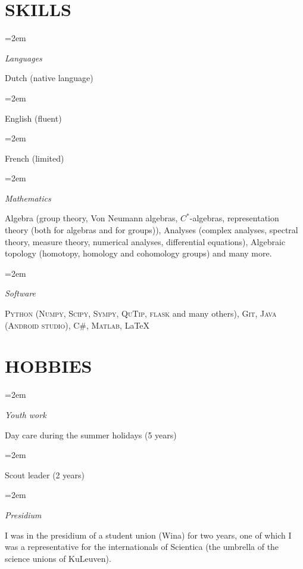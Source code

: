 \documentclass[paper=a4,fontsize=11pt]{scrartcl} %
\newlength{\spacebox}
\newcommand{\NewPart}[1]{\section*{\uppercase{#1}}}
\newcommand{\PersonalEntry}[2]{
		\noindent\hangindent=2em\hangafter=0 %
		\parbox{\spacebox}{        %
		\textit{#1}}		       %
		\hspace{1.5em} #2 \par}    %
\newcommand{\SkillsEntry}[2]{      %
		\noindent\hangindent=2em\hangafter=0 %
		\parbox[t]{\spacebox}{        %
		\textit{#1}}			   %
		\hspace{1.5em} \parbox[t]{0.8\textwidth}{#2} \par}    %
\begin{document}
\NewPart{Skills}{}

\SkillsEntry{Languages}{Dutch (native language)}
\SkillsEntry{}{English (fluent)}
\SkillsEntry{}{French (limited)}

\SkillsEntry{Mathematics}{Algebra (group theory, Von Neumann algebras, $C^*$-algebras, representation theory (both for algebras and for groups)), Analyses (complex analyses, spectral theory, measure theory, numerical analyses, differential equations), Algebraic topology (homotopy, homology and cohomology groups) and many more.}

\SkillsEntry{Software}{\textsc{Python} (\textsc{Numpy}, \textsc{Scipy}, \textsc{Sympy}, \textsc{QuTip}, \textsc{flask} and many others), \textsc{Git}, \textsc{Java} (\textsc{Android studio}), C\#, \textsc{Matlab}, \LaTeX}
\clearpage
\NewPart{Hobbies}{}

\SkillsEntry{Youth work}{Day care during the summer holidays (5 years)}
\SkillsEntry{}{Scout leader (2 years)}
\SkillsEntry{Presidium}{I was in the presidium of a student union (Wina) for two years, one of which I was a representative for the internationals of Scientica (the umbrella of the science unions of KuLeuven).}



\end{document}
